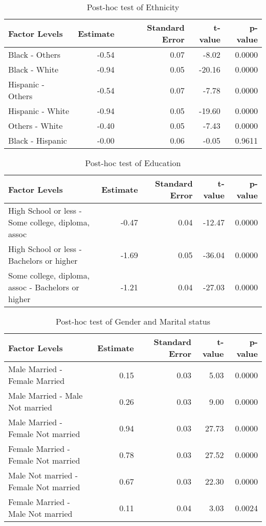 \begin{table}[H]
\footnotesize
\centering
\begin{tabular}{lrrrr}
  \hline
  Factor Levels & Estimate & Standard Error & t-value & p-value \\ 
  \hline
   Black - Others & -0.54 & 0.07 & -8.02 & 0.0000 \\ 
   Black - White & -0.94 & 0.05 & -20.16 & 0.0000 \\ 
   Hispanic - Others & -0.54 & 0.07 & -7.78 & 0.0000 \\ 
   Hispanic - White & -0.94 & 0.05 & -19.60 & 0.0000 \\ 
   Others - White & -0.40 & 0.05 & -7.43 & 0.0000 \\ 
   Black - Hispanic & -0.00 & 0.06 & -0.05 & 0.9611 \\ 
  \hline
\end{tabular}
\caption{Post-hoc test of Ethnicity} 
\label{tab:race_origin}
\end{table}

\begin{table}[H]
\footnotesize
\centering
\begin{tabular}{lrrrr}
  \hline
Factor Levels & Estimate & Standard Error & t-value & p-value \\ 
  \hline
 High School or less - Some college, diploma, assoc & -0.47 & 0.04 & -12.47 & 0.0000 \\ 
   High School or less - Bachelors or higher & -1.69 & 0.05 & -36.04 & 0.0000 \\ 
   Some college, diploma, assoc - Bachelors or higher & -1.21 & 0.04 & -27.03 & 0.0000 \\ 
   \hline
\end{tabular}
\caption{Post-hoc test of Education} 
\label{tab:education}
\end{table}

\begin{table}[H]
\footnotesize
\centering
\begin{tabular}{lrrrr}
  \hline
Factor Levels & Estimate & Standard Error & t-value & p-value \\ 
  \hline
  Male Married -  Female Married & 0.15 & 0.03 & 5.03 & 0.0000 \\ 
    Male Married -  Male Not married & 0.26 & 0.03 & 9.00 & 0.0000 \\ 
    Male Married -  Female Not married & 0.94 & 0.03 & 27.73 & 0.0000 \\ 
    Female Married -  Female Not married & 0.78 & 0.03 & 27.52 & 0.0000 \\ 
    Male Not married -  Female Not married & 0.67 & 0.03 & 22.30 & 0.0000 \\ 
    Female Married -  Male Not married & 0.11 & 0.04 & 3.03 & 0.0024 \\ 
   \hline
\end{tabular}
\caption{Post-hoc test of Gender and Marital status} 
\label{tab:gender:ms}
\end{table}

